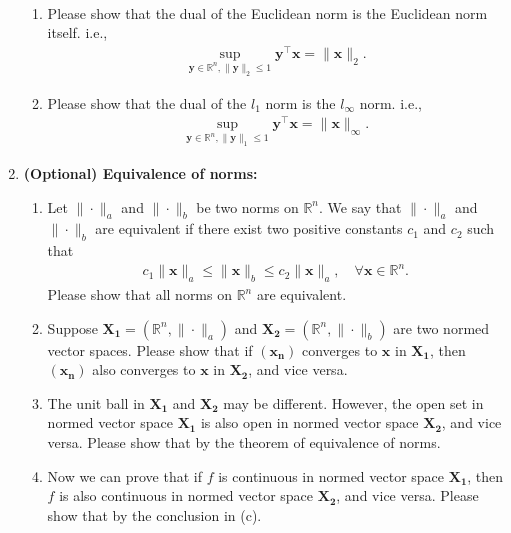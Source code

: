 \documentclass[11pt,letter,notitlepage]{article}
\theoremstyle{definition}
\begin{document}
\begin{exercise}[Norms]
\begin{enumerate}
\begin{align*}
		\end{align*}
		\begin{enumerate}
			\item Please show that the dual of the Euclidean norm is the Euclidean norm itself. i.e., 
			\begin{align*}
				\sup_{\mathbf{y}\in \mathbb{R}^n, \|\mathbf{y}\|_2\le 1}\mathbf{y}^{\top}\mathbf{x} = \|\mathbf{x}\|_2.
			\end{align*}
			\item Please show that the dual of the $l_1$ norm is the $l_{\infty}$ norm. i.e.,
			\begin{align*}
				\sup_{\mathbf{y}\in \mathbb{R}^n, \|\mathbf{y}\|_1\le 1}\mathbf{y}^{\top}\mathbf{x} = \|\mathbf{x}\|_{\infty}.
			\end{align*}
		\end{enumerate}
		\item \textbf{(Optional) Equivalence of norms:} 
            \begin{enumerate}
    \item Let $\|\cdot\|_a$ and $\|\cdot\|_b$ be two norms on $\mathbb{R}^n$. We say that $\|\cdot\|_a$ and $\|\cdot\|_b$ are equivalent if there exist two positive constants $c_1$ and $c_2$ such that
    \begin{align*}
        c_1\|\mathbf{x}\|_a \leq \|\mathbf{x}\|_b \leq c_2\|\mathbf{x}\|_a,\quad \forall \mathbf{x}\in \mathbb{R}^n.
    \end{align*}
    Please show that all norms on $\mathbb{R}^n$ are equivalent.
    
    \item Suppose $\mathbf{X_1}=(\mathbb{R}^n, \|\cdot\|_a)$ and $\mathbf{X_2}=(\mathbb{R}^n, \|\cdot\|_b)$ are two normed vector spaces. Please show that if $(\mathbf{x_n})$ converges to $\mathbf{x}$ in $\mathbf{X_1}$, then $(\mathbf{x_n})$ also converges to $\mathbf{x}$ in $\mathbf{X_2}$, and vice versa.
    
    \item The unit ball in $\mathbf{X_1}$ and $\mathbf{X_2}$ may be different. However, the open set in normed vector space $\mathbf{X_1}$ is also open in normed vector space $\mathbf{X_2}$, and vice versa. Please show that by the theorem of equivalence of norms.
    
    \item Now we can prove that if $f$ is continuous in normed vector space $\mathbf{X_1}$, then $f$ is also continuous in normed vector space $\mathbf{X_2}$, and vice versa. Please show that by the conclusion in (c).
\end{enumerate}


\end{enumerate}
\end{exercise}
\end{document}
